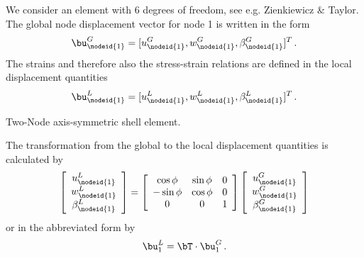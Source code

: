 We consider an element with 6 degrees of freedom, see e.g. 
{\sc Zienkiewicz \& Taylor}. 
The global node displacement vector for node 1 is 
written in the form
\begin{equation}
\bu_{\nodeid{1}}^G = [ u_{\nodeid{1}}^G , w_{\nodeid{1}}^G , \beta_{\nodeid{1}}^G ]^T \, .
\end{equation}
The strains and therefore also the stress-strain relations 
are defined in the local displacement quantities 
\begin{equation}
\bu_{\nodeid{1}}^L = [ u_{\nodeid{1}}^L , w_{\nodeid{1}}^L , \beta_{\nodeid{1}}^L ]^T \, .
\end{equation}
\begin{Figure}[hb]
\begin{center}

\setlength{\baselineskip}{11pt}
\caption{Two-Node axis-symmetric shell element.}
\end{center}
\label{figschale3a}
\end{Figure}%

The transformation from the global to the local 
displacement quantities is calculated by 
\begin{equation}
\left[ 
\begin{array}{c}
u_{\nodeid{1}}^L \\ w_{\nodeid{1}}^L \\ \beta_{\nodeid{1}}^L
\end{array}
\right] = \left[ 
\begin{array}{ccc}
\cos \phi & \sin \phi & 0 \\
- \sin \phi & \cos \phi & 0 \\
0 & 0 & 1
\end{array}
\right]
\left[ 
\begin{array}{c}
u_{\nodeid{1}}^G \\ w_{\nodeid{1}}^G \\ \beta_{\nodeid{1}}^G
\end{array}
\right]
\end{equation}
or in the abbreviated form by 
\begin{equation}
\bu_1^L = \bT \cdot \bu_1^G \, . 
\label{eq:trans}
\end{equation}


